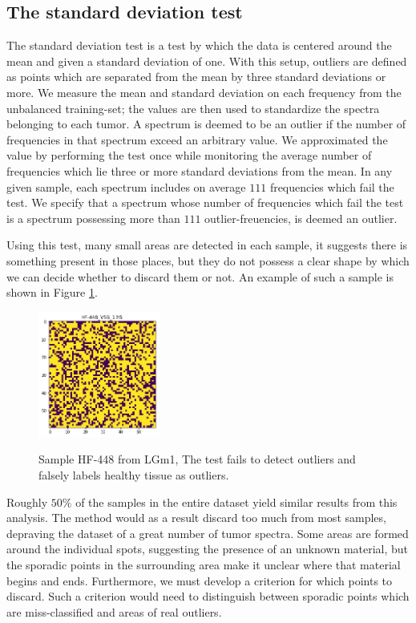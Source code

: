 \subsection{The standard deviation test}

The standard deviation test is a test by which the data is centered around the mean and given a standard deviation of one. With this setup, outliers are defined as points which are separated from the mean by three standard deviations or more. We measure the mean and standard deviation on each frequency from the unbalanced training-set; the values are then used to standardize the spectra belonging to each tumor. A spectrum is deemed to be an outlier if the number of frequencies in that spectrum exceed an arbitrary value. We approximated the value by performing the test once while monitoring the average number of frequencies which lie three or more standard deviations from the mean. In any given sample, each spectrum includes on average $111$ frequencies which fail the test. We specify that a spectrum whose number of frequencies which fail the test is a spectrum possessing more than $111$ outlier-freuencies, is deemed an outlier. 

Using this test, many small areas are detected in each sample, it suggests there is something present in those places, but they do not possess a clear shape by which we can decide whether to discard them or not. An example of such a sample is shown in Figure \ref{fig:stdHF448}.

\begin{figure}[H]

    \centering
{\includegraphics[width=4cm]{images/STDtest/LGm-1/HF-448_V5B_1.h5_3.png} }
\caption{Sample HF-448 from LGm1, The test fails to detect outliers and falsely labels healthy tissue as outliers.\label{fig:stdHF448}}%

\end{figure}

Roughly $50\%$ of the samples in the entire dataset yield similar results from this analysis. The method would as a result discard too much from most samples, depraving the dataset of a great number of tumor spectra. Some areas are formed around the individual spots, suggesting the presence of an unknown material, but the sporadic points in the surrounding area make it unclear where that material begins and ends. Furthermore, we must develop a criterion for which points to discard. Such a criterion would need to distinguish between sporadic points which are miss-classified and areas of real outliers.

